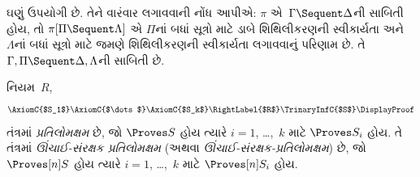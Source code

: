  ઘણું ઉપયોગી છે.
તેને વારંવાર લગાવવાની નોંધ આપીએ:
$\pi$ એ~$\Gamma \Sequent \Delta$ની સાબિતી હોય,
તો $\pi[\Pi \Sequent \Lambda]$ એ
$\Pi$નાં બધાં સૂત્રો માટે ડાબે શિથિલીકરણની સ્વીકાર્યતા
અને~$\Lambda$નાં બધાં સૂત્રો માટે
જમણે શિથિલીકરણની સ્વીકાર્યતા લગાવવાનું પરિણામ છે.
તે $\Gamma, \Pi \Sequent \Delta, \Lambda$ની સાબિતી છે.
\endgroup

\begingroup
\makeatletter{}\makeatother


\label{guunit:OLP-0701}


\begin{defn}
નિયમ~$R$,
\[
\AxiomC{$S_1$}
\AxiomC{$\dots$}
\AxiomC{$S_k$}
\RightLabel{$R$}
\TrinaryInfC{$S$}
\DisplayProof
\]
તંત્રમાં \emph{પ્રતિલોમક્ષમ} છે,
જો $\Proves S$ હોય ત્યારે
$i = 1$, \dots,~$k$ માટે $\Proves S_i$ હોય.
તે તંત્રમાં \emph{ઊંચાઈ-સંરક્ષક પ્રતિલોમક્ષમ}
(અથવા \emph{ઊંચાઈ-સંરક્ષક-પ્રતિલોમક્ષમ}) છે,
જો $\Proves[n] S$ હોય ત્યારે $i = 1$, \dots,~$k$ માટે
$\Proves[n] S_i$ હોય.
\end{defn}

